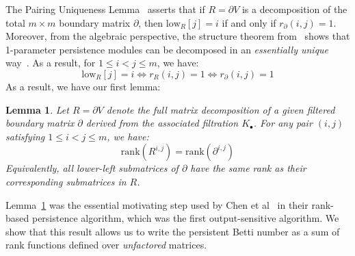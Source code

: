 \documentclass[10pt]{article}
\newtheorem{lemma}{Lemma}
\begin{document}
The Pairing Uniqueness Lemma~\cite{} asserts that if $R = \partial V$ is a decomposition of the total $m \times m$ boundary matrix $\partial$, then $\mathrm{low}_R[j] = i$ if and only if $r_\partial(i,j) = 1$. Moreover, from the algebraic perspective, the structure theorem from~\cite{} shows that 1-parameter persistence modules can be decomposed in an \emph{essentially unique} way~\cite{}. As a result, for $1 \leq i < j \leq m$, we have:
\begin{equation}
	\mathrm{low}_R[j] = i \iff r_R(i,j) = 1 \iff r_\partial(i,j) = 1 
\end{equation} 
As a result, we have our first lemma: 
\begin{lemma}\label{lemma:rank}
Let $R = \partial V$ denote the full matrix decomposition of a given filtered boundary matrix $\partial$ derived from the associated filtration $K_\bullet$. For any pair $(i,j)$ satisfying $1 \leq i < j \leq m$, we have:
	\begin{equation}
		\mathrm{rank}(R^{i,j}) = \mathrm{rank}(\partial^{i, j})
	\end{equation}
Equivalently, all lower-left submatrices of $\partial$ have the same rank as their corresponding submatrices in $R$. 
\end{lemma}
Lemma~\ref{lemma:rank} was the essential motivating step used by Chen et al~\cite{} in their rank-based persistence algorithm, which was the first output-sensitive algorithm. We show that this result allows us to write the persistent Betti number as a sum of rank functions defined over \emph{unfactored} matrices. 
\end{document}
